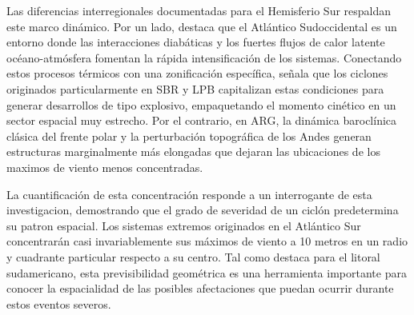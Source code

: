 Las diferencias interregionales documentadas para el Hemisferio Sur respaldan este marco dinámico. Por un lado, \citet{reboita2018extratropical} destaca que el Atlántico Sudoccidental es un entorno donde las interacciones diabáticas y los fuertes flujos de calor latente océano-atmósfera fomentan la rápida intensificación de los sistemas. Conectando estos procesos térmicos con una zonificación específica, \citet{gramcianinov2023impact} señala que los ciclones originados particularmente en SBR y LPB capitalizan estas condiciones para generar desarrollos de tipo explosivo, empaquetando el momento cinético en un sector espacial muy estrecho. Por el contrario, en ARG, la dinámica baroclínica clásica del frente polar y la perturbación topográfica de los Andes generan estructuras marginalmente más elongadas que dejaran las ubicaciones de los maximos de viento menos concentradas.

La cuantificación de esta concentración responde a un interrogante de esta investigacion, demostrando que el grado de severidad de un ciclón predetermina su patron espacial. Los sistemas extremos originados en el Atlántico Sur concentrarán casi invariablemente sus máximos de viento a 10 metros en un radio y cuadrante particular respecto a su centro. Tal como destaca \citet{dalanhese2023new} para el litoral sudamericano, esta previsibilidad geométrica es una herramienta importante para conocer la espacialidad de las posibles afectaciones que puedan ocurrir durante estos eventos severos.

